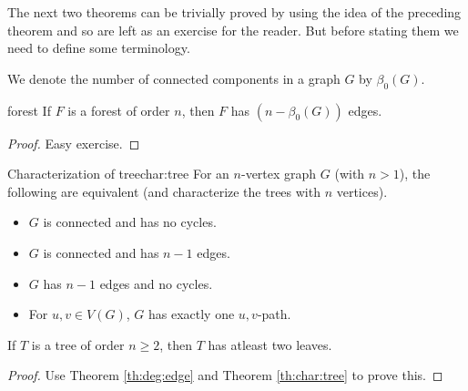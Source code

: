 \documentclass[../basic_graph_theory.tex]{subfiles}
\begin{document}
The next two theorems can be trivially proved by using the idea of the preceding theorem and so are left as an exercise for the reader. But before stating them we need to define some terminology.

We denote the number of connected components in a graph $ G $ by $\beta_{0}(G)$.

\begin{Thm}{}{forest}
    If $F$ is a forest of order $n$, then $F$ has $(n-\beta_{0}(G))$ edges.
\end{Thm}
\begin{proof}
    Easy exercise.
\end{proof}

\begin{Thm}{Characterization of tree}{char:tree}
    For an $n$-vertex graph $G$ (with $n > 1$), the following are equivalent (and characterize the trees with $n$ vertices).
    \begin{itemize}
        \item $G$ is connected and has no cycles.
        \item $G$ is connected and has $n - 1$ edges.
        \item $G$ has $n - 1$ edges and no cycles.
        \item For $u, v \in V(G)$, $G$ has exactly one $u, v$-path.
    \end{itemize}
\end{Thm}

\begin{Thm}{}{}
    If $T$ is a tree of order $n \ge 2$, then $T$ has atleast two leaves.
\end{Thm}
\begin{proof}
    Use Theorem \ref{th:deg:edge} and Theorem \ref{th:char:tree} to prove this.
\end{proof}
\end{document}
